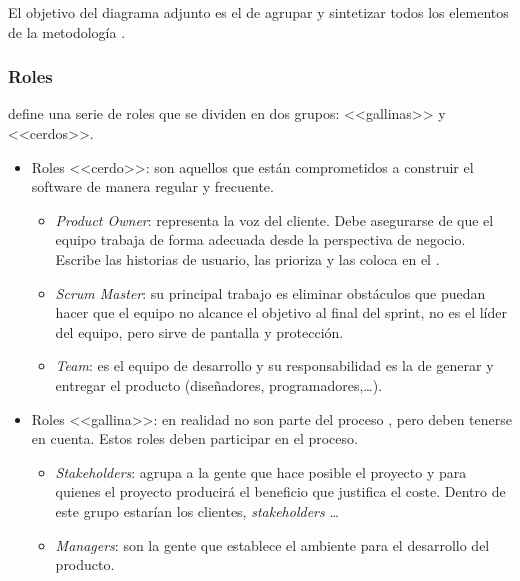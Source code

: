 El objetivo del diagrama adjunto  es el de agrupar y sintetizar todos los elementos de la metodología \scrum{}.


\subsubsection*{Roles}
\scrum{} \cite{scrum_wiki} define una serie de roles que se dividen en dos grupos: <<gallinas>> y <<cerdos>>.
\begin{itemize}
 \item Roles <<cerdo>>: son aquellos que están comprometidos a construir el software de manera regular y frecuente.
  \begin{itemize}
   \item \textit{Product Owner}: representa la voz del cliente. Debe asegurarse de que el equipo trabaja de forma adecuada desde la perspectiva de negocio. Escribe las historias de usuario, las prioriza y las coloca en el \productbacklog{}.
   \item \textit{Scrum Master}: su principal trabajo es eliminar obstáculos que puedan hacer que el equipo no alcance el objetivo al final del sprint, no es el líder del equipo, pero sirve de pantalla y protección.
   \item \textit{Team}: es el equipo de desarrollo y su responsabilidad es la de generar y entregar el producto (diseñadores, programadores,\dots).
  \end{itemize}
 \item Roles <<gallina>>: en realidad no son parte del proceso \scrum{}, pero deben tenerse en cuenta. Estos roles deben participar en el proceso.
  \begin{itemize}
   \item \textit{Stakeholders}: agrupa a la gente que hace posible el proyecto y para quienes el proyecto producirá el beneficio que justifica el coste. Dentro de este grupo estarían los clientes, \textit{stakeholders} \dots
   \item \textit{Managers}: son la gente que establece el ambiente para el desarrollo del producto.
  \end{itemize}
\end{itemize}

